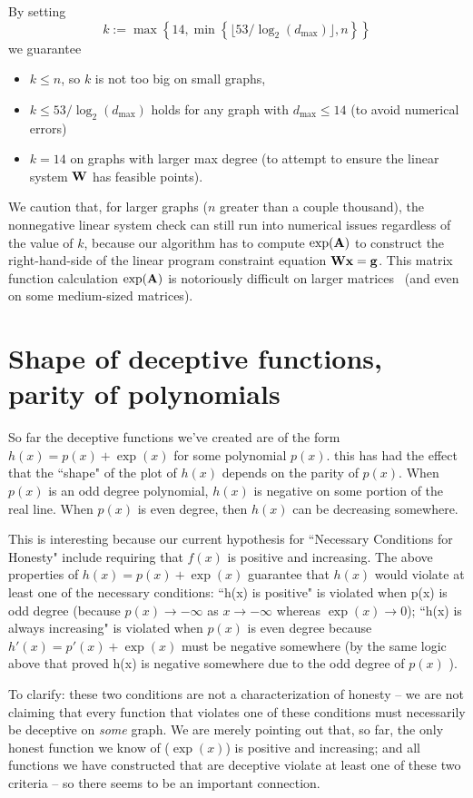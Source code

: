 \documentclass[a4paper,10pt]{article}
\providecommand{\dmax}{d_{\max}}
\begin{document}
By setting
\begin{equation}\label{eqn:def-max-power}
  k := \max\left\{ 14,  \min\left\{ \lfloor 53 / \log_2( \dmax ) \rfloor , n\right\}  \right\}
\end{equation}
we guarantee
\begin{itemize}
  \item  $k \leq n$, so $k$ is not too big on small graphs,
  \item  $k \leq 53 / \log_2(\dmax)$ holds for any graph with $\dmax \leq 14$ (to avoid numerical errors)
  \item  $k = 14$ on graphs with larger max degree (to attempt to ensure the linear system $\textbf{W}$ has feasible points).
\end{itemize}
We caution that, for larger graphs ($n$ greater than a couple thousand), the nonnegative linear system check can still run into numerical issues regardless of the value of $k$, because our algorithm has to compute $\exp(\textbf{A})$ to construct the right-hand-side of the linear program constraint equation $\textbf{W}\textbf{x} = \textbf{g}$. This matrix function calculation $\exp(\textbf{A})$ is notoriously difficult on larger matrices~\cite{moler2003nineteen} (and even on some medium-sized matrices).


\section{Shape of deceptive functions, parity of polynomials}

So far the deceptive functions we've created are of the form $h(x) = p(x) + \exp(x)$ for some polynomial $p(x)$. this has had the effect that the ``shape" of the plot of $h(x)$ depends on the parity of $p(x)$. When $p(x)$ is an odd degree polynomial, $h(x)$ is negative on some portion of the real line. When $p(x)$ is even degree, then $h(x)$ can be decreasing somewhere.

This is interesting because our current hypothesis for ``Necessary Conditions for Honesty" include requiring that $f(x)$ is positive and increasing. The above properties of $h(x) = p(x) + \exp(x)$ guarantee that $h(x)$ would violate at least one of the necessary conditions: ``h(x) is positive" is violated when p(x) is odd degree (because $p(x) \rightarrow -\infty$ as $x \rightarrow -\infty$ whereas $\exp(x) \rightarrow 0$); ``h(x) is always increasing" is violated when $p(x)$ is even degree because $h'(x) = p'(x) + \exp(x)$ must be negative somewhere (by the same logic above that proved h(x) is negative somewhere due to the odd degree of $p(x)$ ).

To clarify: these two conditions are not a characterization of honesty -- we are not claiming that every function that violates one of these conditions must necessarily be deceptive on \emph{some} graph. We are merely pointing out that, so far, the only honest function we know of ($\exp(x)$) is positive and increasing; and all functions we have constructed that are deceptive violate at least one of these two criteria -- so there seems to be an important connection.

{\footnotesize


}
\end{document}
